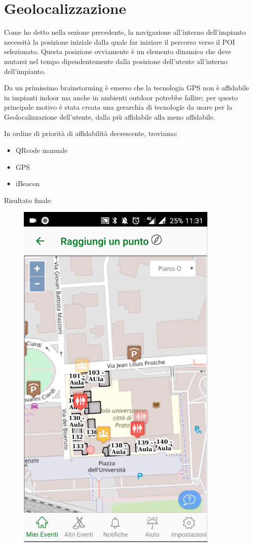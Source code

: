 \section{Geolocalizzazione}
Come ho detto nella sezione precedente, la navigazione all'interno dell'impianto necessità la posizione iniziale
dalla quale far iniziare il percorso verso il POI selezionato.
Questa posizione ovviamente è un elemento dinamico che deve mutarsi nel tempo dipendentemente dalla posizione
dell'utente all'interno dell'impianto.

Da un primissimo brainstorming è emerso che la tecnologia GPS non è affidabile in impianti indoor ma anche in ambienti
outdoor potrebbe fallire; per questo principale motivo è stata creata una gerarchia di tecnologie da usare per
la Geolocalizzazione dell'utente, dalla più affidabile alla meno affidabile.

In ordine di priorità di affidabilità decrescente, troviamo:

\begin{itemize}
    \item QRcode manuale
    \item GPS
    \item iBeacon
\end{itemize}


Risultato finale:
\begin{figure}[H]
    \centering  
    \includegraphics[scale=0.5]{img/cap2/geo-1}
\end{figure}


